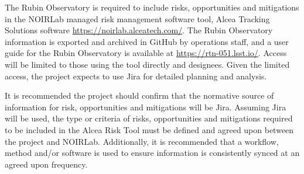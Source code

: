 The Rubin Observatory is required to include risks, opportunities and mitigations in the NOIRLab managed risk management software tool, Alcea Tracking Solutions software \url{https://noirlab.alceatech.com/}.
The Rubin Observatory information is exported and archived in GitHub by operations staff, and a user guide for the Rubin Observatory is available at \url{https://rtn-051.lsst.io/}.
Access will be limited to those using the tool directly and designees.
Given the limited access, the project expects to use Jira for detailed planning and analysis.

It is recommended the project should confirm that the normative source of information for risk, opportunities and mitigations will be Jira.
Assuming Jira will be used, the type or criteria of risks, opportunities and mitigations required to be included in the Alcea Risk Tool must be defined and agreed upon between the project and NOIRLab.
Additionally, it is recommended that a workflow, method and/or software is used to ensure information is consistently synced at an agreed upon frequency.
